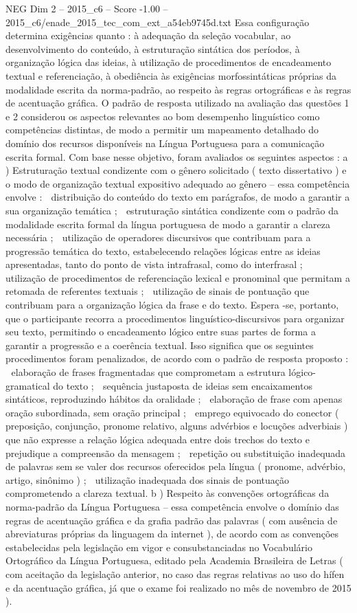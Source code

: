 \begin{textsample}{NEG Dim 2 – 2015\_c6 – Score -1.00 – 2015\_c6/enade\_2015\_tec\_com\_ext\_a54eb9745d.txt}
Essa configuração determina exigências quanto : à adequação da seleção vocabular, ao desenvolvimento do conteúdo, à estruturação sintática dos períodos, à organização lógica das ideias, à utilização de procedimentos de encadeamento textual e referenciação, à obediência às exigências morfossintáticas próprias da modalidade escrita da norma-padrão, ao respeito às regras ortográficas e às regras de acentuação gráfica.
O padrão de resposta utilizado na avaliação das questões 1 e 2 considerou os aspectos relevantes ao bom desempenho linguístico como competências distintas, de modo a permitir um mapeamento detalhado do domínio dos recursos disponíveis na Língua Portuguesa para a comunicação escrita formal.
Com base nesse objetivo, foram avaliados os seguintes aspectos : a ) Estruturação textual condizente com o gênero solicitado ( texto dissertativo ) e o modo de organização textual expositivo adequado ao gênero – essa competência envolve :  distribuição do conteúdo do texto em parágrafos, de modo a garantir a sua organização temática ;  estruturação sintática condizente com o padrão da modalidade escrita formal da língua portuguesa de modo a garantir a clareza necessária ;  utilização de operadores discursivos que contribuam para a progressão temática do texto, estabelecendo relações lógicas entre as ideias apresentadas, tanto do ponto de vista intrafrasal, como do interfrasal ;  utilização de procedimentos de referenciação lexical e pronominal que permitam a retomada de referentes textuais ;  utilização de sinais de pontuação que contribuam para a organização lógica da frase e do texto.
Espera -se, portanto, que o participante recorra a procedimentos linguístico-discursivos para organizar seu texto, permitindo o encadeamento lógico entre suas partes de forma a garantir a progressão e a coerência textual.
Isso significa que os seguintes procedimentos foram penalizados, de acordo com o padrão de resposta proposto :  elaboração de frases fragmentadas que comprometam a estrutura lógico-gramatical do texto ;  sequência justaposta de ideias sem encaixamentos sintáticos, reproduzindo hábitos da oralidade ;  elaboração de frase com apenas oração subordinada, sem oração principal ;  emprego equivocado do conector ( preposição, conjunção, pronome relativo, alguns advérbios e locuções adverbiais ) que não expresse a relação lógica adequada entre dois trechos do texto e prejudique a compreensão da mensagem ;  repetição ou substituição inadequada de palavras sem se valer dos recursos oferecidos pela língua ( pronome, advérbio, artigo, sinônimo ) ;  utilização inadequada dos sinais de pontuação comprometendo a clareza textual. b ) Respeito às convenções ortográficas da norma-padrão da Língua Portuguesa – essa competência envolve o domínio das regras de acentuação gráfica e da grafia padrão das palavras ( com ausência de abreviaturas próprias da linguagem da internet ), de acordo com as convenções estabelecidas pela legislação em vigor e consubstanciadas no Vocabulário Ortográfico da Língua Portuguesa, editado pela Academia Brasileira de Letras ( com aceitação da legislação anterior, no caso das regras relativas ao uso do hífen e da acentuação gráfica, já que o exame foi realizado no mês de novembro de 2015 ).

\end{textsample}
